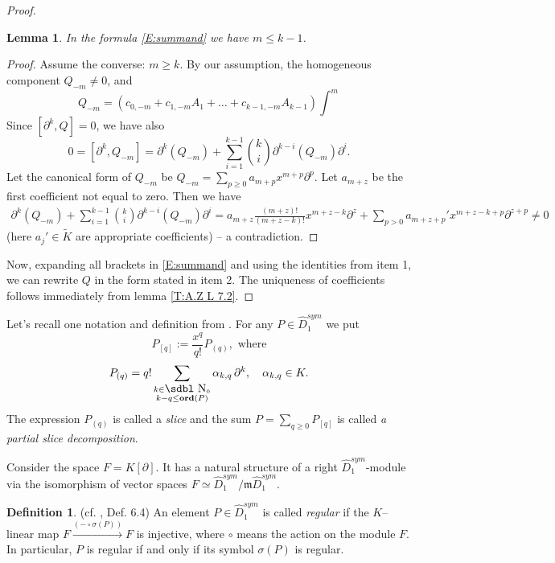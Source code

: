 \documentclass[11pt]{article}
\theoremstyle{definition}
\newcommand{\sdn}{{\mbox{\sdbl N}}}
\newcommand{\idm}{\mathfrak{m}}
\newcommand{\Ord}{\mathop {\rm \bf ord}}
\newtheorem{Def}{Definition}[section]
\theoremstyle{plain}
\newtheorem{lemma}{Lemma}[section]
\numberwithin{equation}{section}
\begin{document}
\begin{proof}
\begin{lemma}
\label{L:restriction_on_int}
In the formula \eqref{E:summand} we have $m\le k-1$. 
\end{lemma}

\begin{proof}
Assume the converse: $m\ge k$. By our assumption, the homogeneous component $Q_{-m}\neq 0$, and 
$$
Q_{-m}=(c_{0,-m}+c_{1,-m}{A}_1+\ldots + c_{k-1,-m}{A}_{k-1})\int^m
$$ 
Since $[\partial^k,Q]=0$, we have also 
$$
0=[\partial^k,Q_{-m}]=\partial^k(Q_{-m}) +\sum_{i=1}^{k-1}\binom{k}{i}\partial^{k-i}(Q_{-m})\partial^i.
$$
Let the canonical form of $Q_{-m}$ be $Q_{-m}=\sum_{p\ge 0}a_{m+p}x^{m+p}\partial^p$. Let $a_{m+z}$ be the first coefficient not equal to zero. Then we have
\begin{multline*}
\partial^k(Q_{-m}) +\sum_{i=1}^{k-1}\binom{k}{i}\partial^{k-i}(Q_{-m})\partial^i = 
a_{m+z}\frac{(m+z)!}{(m+z-k)!}x^{m+z-k}\partial^z + \sum_{p>0}a_{m+z+p}'x^{m+z-k+p}\partial^{z+p}\neq 0
\end{multline*}
(here $a_j'\in \tilde{K}$ are appropriate coefficients) -- a contradiction. 
\end{proof}

Now, expanding all brackets in \eqref{E:summand} and using the identities from item 1, we can rewrite $Q$ in the form stated in item 2. The uniqueness of coefficients follows immediately from lemma \ref{T:A.Z L 7.2}.

\end{proof}

Let's recall one notation and definition from \cite{A.Z}. For any $P\in \hat{D}_1^{sym}$ we put 
$$
P_{[q]}:= \frac{x^{q}}{q!}P_{(q)}, \mbox{ where}
$$ 
$$
P_{(q)} = q! \sum_{\substack{{k} \in \sdn_0 \\ {k} - {q} \le  \Ord (P)}} \alpha_{{k}, {q}} \, {\partial}^{{k}}, \quad \alpha_{{k}, {q}}\in K.
$$
The expression $P_{(q)}$ is called a {\it slice} and the sum  $P=\sum_{q\ge 0}P_{[q]}$ is called {\it a partial slice decomposition}.

Consider the space $F=K[\partial ]$. It has a natural structure of a right $\hat{D}_1^{sym}$-module via the isomorphism of vector spaces $F\simeq \hat{D}_1^{sym}/\idm \hat{D}_1^{sym}$.

\begin{Def}{(cf. \cite{A.Z}, Def. 6.4)}
\label{D:regular}
An element $P \in \hat{D}_1^{sym}$ is called \emph{regular} if the $K$--linear map $F \xrightarrow{ (-\circ \sigma(P))} F$ is injective, where $\circ$ means the action on the module $F$. In particular, $P$ is regular if and only if its symbol $\sigma(P)$ is regular.
\end{Def}
\end{document}
